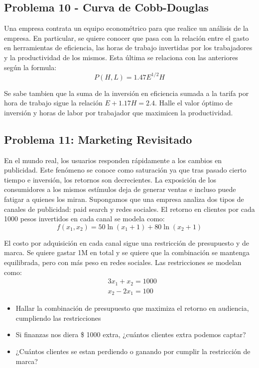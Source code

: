\documentclass[12pt]{article}
\begin{document}
\subsection*{Problema 10 - Curva de Cobb-Douglas}

Una empresa contrata un equipo econométrico para que realice un análisis de la empresa. En particular, se quiere conocer que pasa con la relación entre el gasto en herramientas de eficiencia, las horas de trabajo invertidas por los trabajadores  y la productividad de los mismos. Esta última se relaciona con las anteriores según la formula:
\begin{equation*}
    P(H,L) = 1.47  E^{1/2} H
\end{equation*}

Se sabe tambien que la suma de la inversión en eficiencia sumada a la tarifa por hora de trabajo sigue la relación $E + 1.17 H = 2.4$. Halle el valor óptimo de inversión y horas de labor por trabajador que maximicen la productividad.

\subsection*{Problema 11: Marketing Revisitado}

En el mundo real, los usuarios responden rápidamente a los cambios en publicidad. Este fenómeno se conoce como saturación ya que tras pasado cierto tiempo e inversión, los retornos son decrecientes. La exposición de los consumidores a los mismos estímulos deja de generar ventas e incluso puede fatigar a quienes los miran. Supongamos que una empresa analiza dos tipos de canales de publicidad: paid search y redes sociales. El retorno en clientes por cada 1000 pesos invertidos en cada canal se modela como:
\begin{equation*}
    f(x_1, x_2) = 50\ln (x_1+1) + 80 \ln(x_2+1)
\end{equation*}

El costo por adquisición en cada canal sigue una restricción de presupuesto y de marca. Se quiere gastar 1M en total y se quiere que la combinación se mantenga equilibrada, pero con más peso en redes sociales. Las restricciones se modelan como:
\begin{align*}
    & 3x_1 + x_2 = 1000 \\
    & x_2 - 2x_1 = 100
\end{align*}
\begin{itemize}
    \item[a)] Hallar la combinación de presupuesto que maximiza el retorno en audiencia, cumpliendo las restricciones
    \item[b)] Si finanzas nos diera \$ 1000 extra, ¿cuántos clientes extra podemos captar?
    \item[c)] ¿Cuántos clientes se estan perdiendo o ganando por cumplir la restricción de marca?
\end{itemize}
\end{document}
